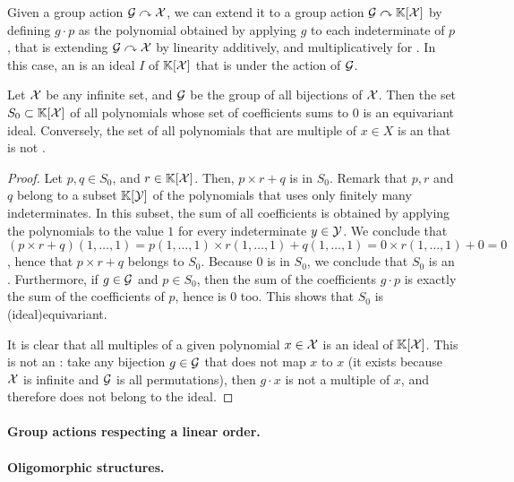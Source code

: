 Given a group action $\mathcal{G} \curvearrowright \mathcal{X}$, we can extend it to a group
action $\mathcal{G} \curvearrowright \mathbb{K}[\mathcal{X}]$ by defining $g \cdot p$ as the
polynomial obtained by applying $g$ to each indeterminate of $p$, that is
extending $\mathcal{G} \curvearrowright \mathcal{X}$ by linearity additively, and
multiplicatively for . In this case, an 
is an ideal $I$ of $\mathbb{K}[\mathcal{X}]$ that is  under the action of
$\mathcal{G}$.

\begin{example}
    \label{ex:idl-equiv}
    Let $\mathcal{X}$ be any infinite set, and $\mathcal{G}$ be the 
    group of all bijections of $\mathcal{X}$. 
    Then the set $S_0 \subset \mathbb{K}[\mathcal{X}]$ of all polynomials 
    whose set of coefficients sums to $0$ is an equivariant ideal.
    Conversely, the set of all polynomials that are multiple
    of $x \in X$ is an  that is not .
\end{example}
\begin{proof}
    Let $p,q\in S_0$, and $r \in \mathbb{K}[\mathcal{X}]$.
    Then, $p \times r + q$ is in $S_0$. Remark that 
    $p,r$ and $q$ belong to a subset $\mathbb{K}[\mathcal{Y}]$ of the 
    polynomials that uses only finitely many indeterminates.
    In this subset, the sum of all coefficients is obtained
    by applying the polynomials to the value $1$ for every indeterminate
    $y \in \mathcal{Y}$. We conclude that
    $(p \times r + q)(1,\dots, 1) 
    = p(1,\dots,1) \times r(1,\dots,1) + q(1,\dots,1)
    = 0 \times r(1, \dots, 1) + 0 = 0$, hence that
    $p \times r + q$ belongs to $S_0$. 
    Because $0$ is in $S_0$, we conclude that $S_0$ is an .
    Furthermore, if $g \in \mathcal{G}$ and $p \in S_0$, then
    the sum of the coefficients $g \cdot p$ is exactly
    the sum of the coefficients of $p$, hence is $0$ too.
    This shows that $S_0$ is \kl(ideal){equivariant}.

    It is clear that all multiples of a given polynomial $x \in \mathcal{X}$
    is an ideal of $\mathbb{K}[\mathcal{X}]$. This is not an :
    take any bijection $g \in \mathcal{G}$ that does not map $x$ to $x$ (it
    exists because $\mathcal{X}$ is infinite and $\mathcal{G}$ is all permutations),
    then $g \cdot x$ is not a multiple of $x$, and therefore does 
    not belong to the ideal.
\end{proof}


\paragraph{Group actions respecting a linear order.}

\paragraph{Oligomorphic structures.}


